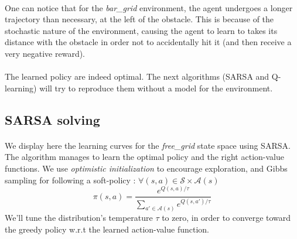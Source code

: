 \documentclass[a4paper]{report}
\begin{document}
{{{				\paragraph{} One can notice that for the \emph{bar\_grid} environment, the agent undergoes a longer trajectory than necessary, at the left of the obstacle. This is because of the stochastic nature of the environment, causing the agent to learn to takes its distance with the obstacle in order not to accidentally hit it (and then receive a very negative reward). 
				
				\paragraph{} The learned policy are indeed optimal. The next algorithms (SARSA and Q-learning) will try to reproduce them without a model for the environment. 
			}
			\subsection{SARSA solving}
			{
				\paragraph{} We display here the learning curves for the \emph{free\_grid} state space using SARSA. The algorithm manages to learn the optimal policy and the right action-value functions. We use \emph{optimistic initialization} to encourage exploration, and Gibbs sampling for following a soft-policy : $\forall (s,a) \in\mathcal{S}\times \mathcal{A}(s)$ 
				\begin{equation}
					\pi(s,a) = \displaystyle \frac{ e^{Q(s,a)/\tau}}{\sum_{a'\in\mathcal{A}(s)}e^{Q(s,a')/\tau}}
				\end{equation}
				We'll tune the distribution's temperature $\tau$ to zero, in order to converge toward the greedy policy w.r.t the learned action-value function. 
				
}}}
\end{document}
